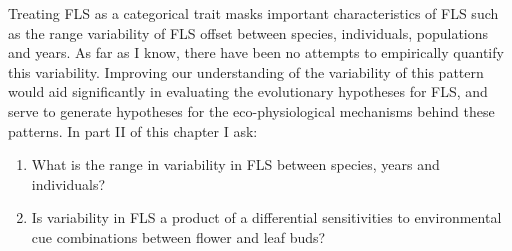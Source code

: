 \documentclass{article}\usepackage[]{graphicx}\usepackage[]{color}
\begin{document}
\indent\indent Treating FLS as a categorical trait masks important characteristics of FLS such as the range variability of FLS offset between species, individuals, populations and years. As far as I know, there have been no attempts to empirically quantify this variability. Improving our understanding of the variability of this pattern would aid significantly in evaluating the evolutionary hypotheses for FLS, and serve to generate hypotheses for the eco-physiological mechanisms behind these patterns. In part II of this chapter I ask:
\begin{enumerate}
\item What is the range in variability in FLS between species, years and individuals?
\item Is variability in FLS a product of a differential sensitivities to environmental cue combinations between flower and leaf buds?
\end{enumerate}
\end{document}
